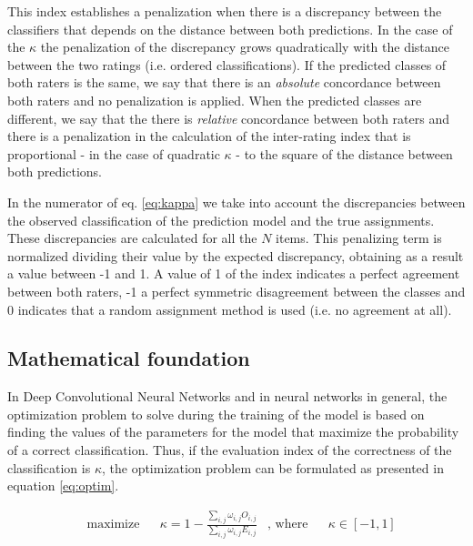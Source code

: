 \documentclass[times,twocolumn,final,authoryear]{elsarticle}
\begin{document}
This index establishes a penalization when there is a discrepancy between the classifiers that depends on the distance between both predictions. In the case of the $\kappa$ the penalization of the discrepancy grows quadratically with the distance between the two ratings (i.e. ordered classifications). If the predicted classes of both raters is the same, we say that there is an \emph{absolute} concordance between both raters and no penalization is applied. When the predicted classes are different, we say that the there is \emph{relative} concordance between both raters and there is a penalization in the calculation of the inter-rating index that is proportional - in the case of quadratic $\kappa$ - to the square of the distance between both predictions. 

In the numerator of eq. \ref{eq:kappa} we take into account the discrepancies between the observed classification of the prediction model and the true assignments. These discrepancies are calculated for all the $N$ items. This penalizing term is normalized dividing their value by the expected  discrepancy, obtaining as a result a value between -1 and 1. A value of 1 of the index indicates a perfect agreement between both raters, -1 a perfect symmetric disagreement between the classes and 0 indicates that a random assignment method is used (i.e. no agreement at all). 

\subsection{Mathematical foundation}

In Deep Convolutional Neural Networks and in neural networks in general, the optimization problem to solve during the training of the model is based on finding the values of the parameters for the model that maximize the probability of a correct classification. Thus, if the evaluation index of the correctness of the classification is $\kappa$, the optimization problem can be formulated as presented in equation \ref{eq:optim}.

\begin{equation}
\label{eq:optim}
\begin{aligned}
& \underset{}{\text{maximize}}
& & \kappa = 1 - \frac{ \sum_{i,j} \omega_{i,j} O_{i,j} }
{\sum_{i,j} \omega_{i,j} E_{i,j}} & \text{, where} & & \kappa \in [-1,1]\\
\end{aligned}
\end{equation}
\end{document}

